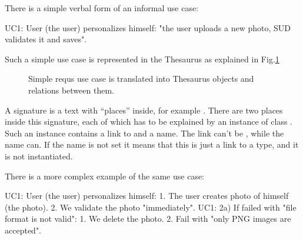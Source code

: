 \documentclass[12pt,oneside,letterpaper]{article}
\begin{document}
There is a simple verbal form of an informal use case:

\begin{ffcode}
UC1: User (the user) personalizes himself: "the user
  uploads a new photo, SUD validates it and saves".
\end{ffcode}

Such a simple use case is represented in the Thesaurus
as explained in Fig.\ref{fig:Simple-UC}

\begin{figure}[ht]
\centering
{}
\caption{Simple requs use case is translated into Thesaurus objects and
relations between them.}
\label{fig:Simple-UC}
\end{figure}

A signature is a text with ``places'' inside, for example
. There are two places inside
this signature, each of which has to be explained by an
instance of class . Such an instance contains
a link to  and a name. The link can't be ,
while the name can. If the name is not set it means that this is just
a link to a type, and it is not instantiated.

There is a more complex example of the same use case:

\begin{ffcode}
UC1: User (the user) personalizes himself:
  1. The user creates photo of himself (the photo).
  2. We validate the photo "immediately".
UC1: 2a) If failed with "file format is not valid":
  1. We delete the photo.
  2. Fail with "only PNG images are accepted".
\end{ffcode}
\end{document}
